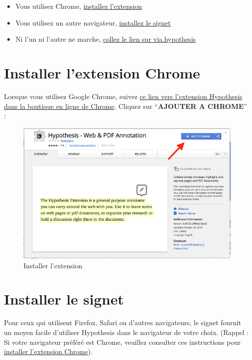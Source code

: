 \documentclass[
]{book}
\providecommand{\tightlist}{%
  \setlength{\itemsep}{0pt}\setlength{\parskip}{0pt}}
\begin{document}
\begin{itemize}
\tightlist
\item
  Vous utilisez Chrome, \protect\hyperlink{s21}{installez l'extension}
\item
  Vous utilisez un autre navigateur, \protect\hyperlink{s22}{installez le signet}
\item
  Ni l'un ni l'autre ne marche, \protect\hyperlink{s23}{collez le lien sur via.hypothesis}
\end{itemize}

\hypertarget{s21}{%
\section{Installer l'extension Chrome}\label{s21}}

Lorsque vous utilisez Google Chrome, suivez \href{https://chrome.google.com/webstore/detail/hypothesis-web-pdf-annota/bjfhmglciegochdpefhhlphglcehbmek}{ce lien vers l'extension Hypothesis dans la boutique en ligne de Chrome}. Cliquez sur ``\textbf{AJOUTER A CHROME}'' :

\begin{figure}
\centering
\includegraphics{img/94d5e4f1e0139b6a3709c5bfecad0737.png}
\caption{Installer l'extension}
\end{figure}

\hypertarget{s22}{%
\section{Installer le signet}\label{s22}}

Pour ceux qui utilisent Firefox, Safari ou d'autres navigateurs, le signet fournit un moyen facile d'utiliser Hypothesis dans le navigateur de votre choix. (Rappel : Si votre navigateur préféré est Chrome, veuillez consulter ces instructions pour \protect\hyperlink{s21}{installer l'extension Chrome}).
\end{document}
